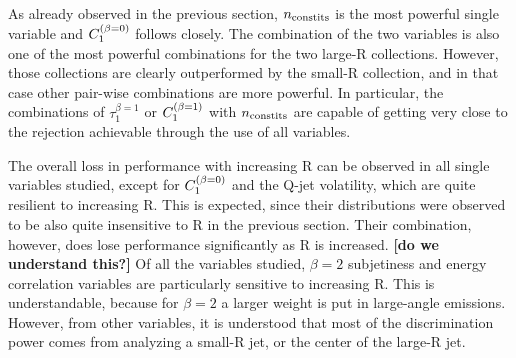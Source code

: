 As already observed in the previous section, $n_{\rm constits}$ is the most powerful single variable and
$C_{1}^{(\beta=0)}$ follows closely. The combination of the two variables is also one of the most powerful
combinations for the two large-R collections. However, those collections are clearly outperformed by
the small-R collection, and in that case other pair-wise combinations are more powerful. In particular,
the combinations of $\tau^{\beta=1}_1$ or $C_{1}^{(\beta=1)}$ with $n_{\rm constits}$ are capable of 
getting very  close to the rejection achievable through the use of all variables. 

The overall loss in performance
with increasing R can be observed in all single variables studied, except for $C_{1}^{(\beta=0)}$ and 
the Q-jet volatility, which are quite resilient to increasing R. This is expected, since their distributions
were observed to be also quite insensitive to R in the previous section. Their combination, however, does lose
performance significantly as R is increased. {\bf [do we understand this?]}
Of all the variables studied, $\beta=2$ subjetiness and energy correlation variables 
are particularly sensitive to increasing R. This is understandable, because for $\beta=2$ 
a larger weight is put in large-angle emissions. However, from other variables, it is understood
that most of the discrimination power comes from analyzing a small-R jet, or the center of the
large-R jet. 

